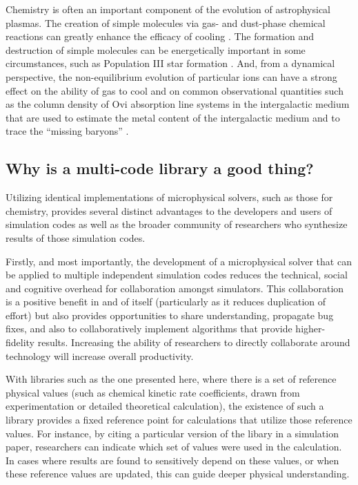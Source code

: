 Chemistry is often an important component of the evolution of
astrophysical plasmas.  The creation of simple molecules via gas- and
dust-phase chemical reactions can greatly enhance the efficacy of
cooling \citep{1979ApJS...41..555H, 2005ApJ...626..627O}.  The formation
and destruction of simple molecules can be energetically important in
some circumstances, such as Population III star formation
\citep{1998ApJ...508..141O, 2002Sci...295...93A, 2008MNRAS.388.1627G,
2009Sci...325..601T}.
And, from a dynamical perspective, the non-equilibrium evolution of
particular ions can have a strong effect on the ability of gas to cool
\citep{1997NewA....2..181A, 1997NewA....2..209A} and on common
observational quantities such as the column density of O{\sc vi} absorption
line systems in the intergalactic medium that are used to estimate the
metal content of the intergalactic medium and to trace the ``missing
baryons'' \citep{2006ApJ...650..573C, 2011ApJ...731....6S,
2013MNRAS.434.1043O, 2014ApJ...796...49S}.

\subsection{Why is a multi-code library a good thing?}

Utilizing identical implementations of microphysical solvers, such as
those for chemistry, provides several distinct advantages to the
developers and users of simulation codes as well as the broader
community of researchers who synthesize results of those simulation
codes.

Firstly, and most importantly, the development of a microphysical solver that
can be applied to multiple independent simulation codes reduces the technical,
social and cognitive overhead for collaboration amongst simulators.
This collaboration is a positive benefit in and of itself (particularly as it
reduces duplication of effort) but also provides opportunities to share
understanding, propagate bug fixes, and also to collaboratively implement 
algorithms that provide higher-fidelity results.  Increasing the ability of
researchers to directly collaborate around technology will increase overall
productivity.

With libraries such as the one presented here, where there is a set of
reference
physical values (such as chemical kinetic rate coefficients, drawn from
experimentation or detailed theoretical calculation), the existence of such a
library provides a fixed reference point for calculations that utilize those
reference values.  For instance, by citing a particular version of
the libary in a simulation paper, researchers can indicate which set of
values were used in the calculation.  In cases where results are found to
sensitively depend on these values, or when these reference values are updated,
this can guide deeper physical understanding.

